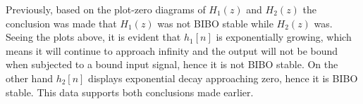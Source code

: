 \documentclass[a4paper, 10pt]{article}
\begin{document}
Previously, based on the plot-zero diagrams of $H_1(z)$ and $H_2(z)$ the conclusion was made that
$H_1(z)$ was not BIBO stable while $H_2(z)$ was. Seeing the plots above, it is evident that $h_1[n]$ is
exponentially growing, which means it will continue to approach infinity and the output will not be bound
when subjected to a bound input signal, hence it is not BIBO stable. On the other hand $h_2[n]$ displays exponential
decay approaching zero, hence it is BIBO stable. This data supports both conclusions made earlier.
\end{document}
